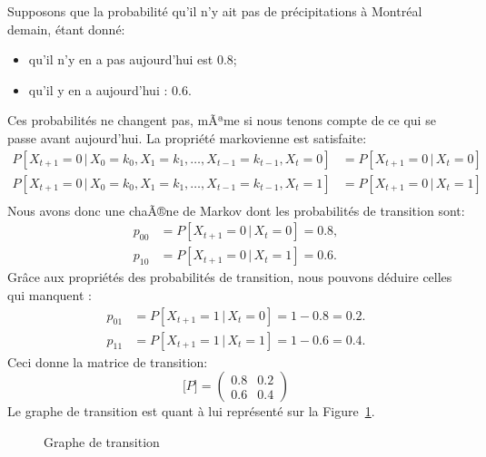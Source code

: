 \begin{example}[Précipitations]
Supposons que la probabilité qu'il n'y ait pas de précipitations à Montréal demain, étant donné:
\begin{itemize}
\item
qu'il n'y en a pas aujourd'hui est 0.8;
\item
qu'il y en a aujourd'hui : 0.6.
\end{itemize}
Ces probabilités ne changent pas, mÃªme si nous tenons compte de ce qui se passe avant aujourd'hui.
La propriété markovienne est satisfaite:
\begin{align*}
P[ X_{t+1} = 0 \,|\, X_0 = k_0, X_1 = k_1, \ldots, X_{t-1} = k_{t-1}, X_t  = 0] &= P[ X_{t+1} = 0 \,|\, X_t  = 0 ] \\
P[ X_{t+1} = 0 \,|\, X_0 = k_0, X_1 = k_1, \ldots, X_{t-1} = k_{t-1}, X_t  = 1] &= P[ X_{t+1} = 0 \,|\, X_t  = 1 ] \\
\end{align*}
Nous avons donc une chaÃ®ne de Markov dont les probabilités de transition sont:
\begin{align*}
p_{00} &= P[X_{t+1} = 0 \,|\, X_t  = 0] = 0.8,\\
p_{10} &= P[X_{t+1} = 0 \,|\, X_t  = 1] = 0.6.
\end{align*}
Grâce aux propriétés des probabilités de transition, nous pouvons déduire celles qui manquent :
\begin{align*}
p_{01} &= P[X_{t+1} = 1 \,|\, X_t  = 0] = 1-0.8 = 0.2.\\
p_{11} &= P[X_{t+1} = 1 \,|\, X_t  = 1] = 1-0.6 = 0.4.
\end{align*}
Ceci donne la matrice de transition:
\[
\boldsymbol[P] =
\begin{pmatrix}
0.8 & 0.2 \\
0.6 & 0.4
\end{pmatrix}
\]
Le graphe de transition est quant à lui représenté sur la Figure~\ref{fig:transition}.
\begin{figure}[htbp]
\begin{center}
\caption{Graphe de transition}
\label{fig:transition}
\end{center}
\end{figure}
\end{example}

